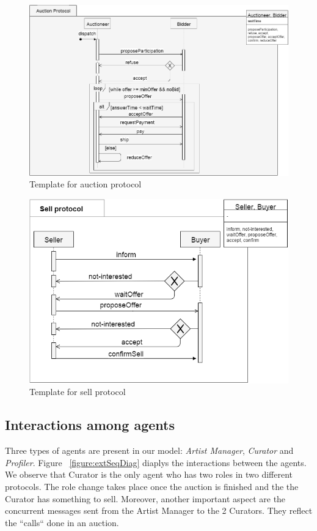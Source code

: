 \documentclass[a4paper,11pt]{report}
\begin{document}
   \begin{figure}[ht!]
    \centering
    \includegraphics[width=\textwidth]{media/auction_protocol.png}
    \caption{Template for auction protocol}
    \label{figure:auctionProtocol}
   \end{figure}
   
   \begin{figure}[ht!]
    \centering
    \includegraphics[width=\textwidth]{media/sell_protocol.png}
    \caption{Template for sell protocol}
    \label{figure:sellProtocol}
   \end{figure}
  
  \subsection{Interactions among agents}
  Three types of agents are present in our model: \textit{Artist Manager}, \textit{Curator}
  and \textit{Profiler}. Figure ~\ref{figure:extSeqDiag} diaplys the interactions between
  the agents. We observe that Curator is the only agent who has two roles in two
  different protocols. The role change takes place once the auction is finished and
  the the Curator has something to sell. Moreover, another important aspect are the concurrent
  messages sent from the Artist Manager to the 2 Curators. They reflect the ``calls`` done
  in an auction.
  
\end{document}
